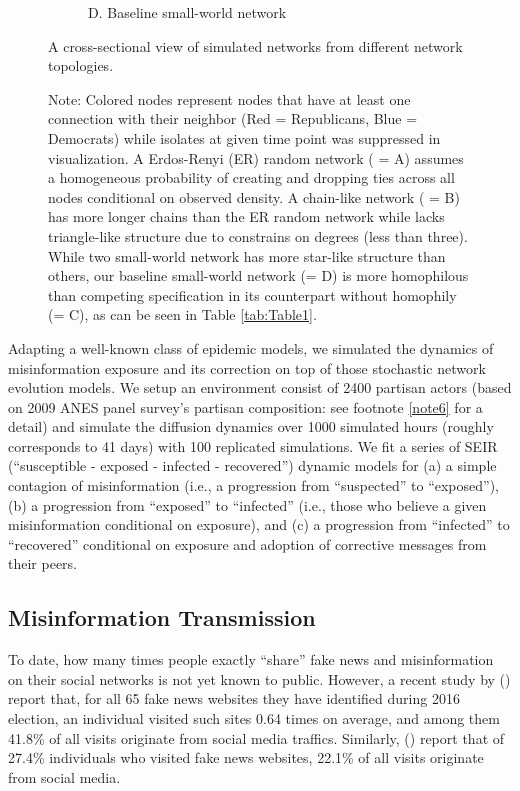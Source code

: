 \documentclass[man, 12pt, a4paper, nolmodern, noextraspace]{apa6}
\begin{document}
\begin{figure}
\begin{subfigure}[t]{0.45\textwidth}
        \caption*{D. Baseline small-world network} \label{fig1:smallworld}
    \end{subfigure}
    
    \vspace{1cm}
    \captionsetup{format=hang}
    \caption{A cross-sectional view of simulated networks from different network topologies.} 
    \label{fig:Figure1}
    \captionsetup{font=small}
    \caption*{Note: Colored nodes represent nodes that have at least one connection with their neighbor (Red = Republicans, Blue = Democrats) while isolates at given time point was suppressed in visualization. A Erdos-Renyi (ER) random network ( = A) assumes a homogeneous probability of creating and dropping ties across all nodes conditional on observed density. A chain-like network ( = B) has more longer chains than the ER random network while lacks triangle-like structure due to constrains on degrees (less than three). While two small-world network has more star-like structure than others, our baseline small-world network (= D) is more homophilous than competing specification in its counterpart without homophily (= C), as can be seen in Table \ref{tab:Table1}.} 
\end{figure}    

  Adapting a well-known class of epidemic models, we simulated the dynamics of misinformation exposure and its correction on top of those stochastic network evolution models. We setup an environment consist of 2400 partisan actors (based on 2009 ANES panel survey's partisan composition: see footnote \ref{note6} for a detail) and simulate the diffusion dynamics over 1000 simulated hours (roughly corresponds to 41 days) with 100 replicated simulations. We fit a series of SEIR (\enquote{susceptible - exposed - infected - recovered}) dynamic models for (a) a simple contagion of misinformation (i.e., a progression from \enquote{suspected} to \enquote{exposed}), (b) a progression from \enquote{exposed} to \enquote{infected} (i.e., those who believe a given misinformation conditional on exposure), and (c) a progression from \enquote{infected} to \enquote{recovered} conditional on exposure and adoption of corrective messages from their peers. 

\subsection{Misinformation Transmission}
    
    To date, how many times people exactly \enquote{share} fake news and misinformation on their social networks is not yet known to public. However, a recent study by \citeauthor{allcott2017social} (\citeyear{allcott2017social}) report that, for all 65 fake news websites they have identified during 2016 election, an individual visited such sites 0.64 times on average, and among them 41.8\% of all visits originate from social media traffics. Similarly, \citeauthor{guess2018selective} (\citeyear{guess2018selective}) report that of 27.4\% individuals who visited fake news websites, 22.1\% of all visits originate from social media. 
\end{document}

